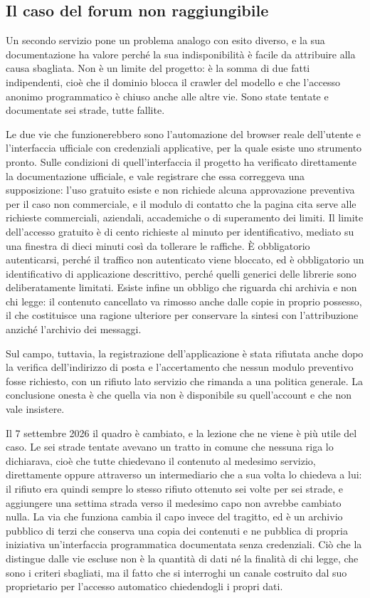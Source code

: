\subsection{Il caso del forum non raggiungibile}

Un secondo servizio pone un problema analogo con esito diverso, e la sua documentazione ha valore perché la sua indisponibilità è facile da attribuire alla causa sbagliata. Non è un limite del progetto: è la somma di due fatti indipendenti, cioè che il dominio blocca il crawler del modello e che l'accesso anonimo programmatico è chiuso anche alle altre vie. Sono state tentate e documentate sei strade, tutte fallite.

Le due vie che funzionerebbero sono l'automazione del browser reale dell'utente e l'interfaccia ufficiale con credenziali applicative, per la quale esiste uno strumento pronto. Sulle condizioni di quell'interfaccia il progetto ha verificato direttamente la documentazione ufficiale, e vale registrare che essa correggeva una supposizione: l'uso gratuito esiste e non richiede alcuna approvazione preventiva per il caso non commerciale, e il modulo di contatto che la pagina cita serve alle richieste commerciali, aziendali, accademiche o di superamento dei limiti. Il limite dell'accesso gratuito è di cento richieste al minuto per identificativo, mediato su una finestra di dieci minuti così da tollerare le raffiche. È obbligatorio autenticarsi, perché il traffico non autenticato viene bloccato, ed è obbligatorio un identificativo di applicazione descrittivo, perché quelli generici delle librerie sono deliberatamente limitati. Esiste infine un obbligo che riguarda chi archivia e non chi legge: il contenuto cancellato va rimosso anche dalle copie in proprio possesso, il che costituisce una ragione ulteriore per conservare la sintesi con l'attribuzione anziché l'archivio dei messaggi.

Sul campo, tuttavia, la registrazione dell'applicazione è stata rifiutata anche dopo la verifica dell'indirizzo di posta e l'accertamento che nessun modulo preventivo fosse richiesto, con un rifiuto lato servizio che rimanda a una politica generale. La conclusione onesta è che quella via non è disponibile su quell'account e che non vale insistere.

Il 7 settembre 2026 il quadro è cambiato, e la lezione che ne viene è più utile del caso. Le sei strade tentate avevano un tratto in comune che nessuna riga lo dichiarava, cioè che tutte chiedevano il contenuto al medesimo servizio, direttamente oppure attraverso un intermediario che a sua volta lo chiedeva a lui: il rifiuto era quindi sempre lo stesso rifiuto ottenuto sei volte per sei strade, e aggiungere una settima strada verso il medesimo capo non avrebbe cambiato nulla. La via che funziona cambia il capo invece del tragitto, ed è un archivio pubblico di terzi che conserva una copia dei contenuti e ne pubblica di propria iniziativa un'interfaccia programmatica documentata senza credenziali. Ciò che la distingue dalle vie escluse non è la quantità di dati né la finalità di chi legge, che sono i criteri sbagliati, ma il fatto che si interroghi un canale costruito dal suo proprietario per l'accesso automatico chiedendogli i propri dati.

